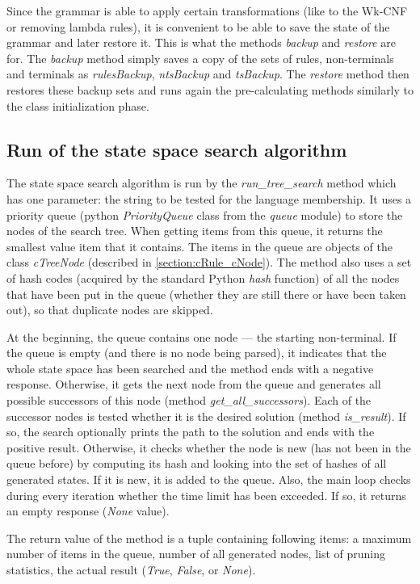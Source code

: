 Since the grammar is able to apply certain transformations (like to the Wk-CNF or removing lambda rules), it is convenient to be able to save the state of the grammar and later restore it. This is what the methods \textit{backup} and \textit{restore} are for. The \textit{backup} method simply saves a copy of the sets of rules, non-terminals and terminals as \textit{rulesBackup}, \textit{ntsBackup} and \textit{tsBackup}. The \textit{restore} method then restores these backup sets and runs again the pre-calculating methods similarly to the class initialization phase.

\subsection{Run of the state space search algorithm}
The state space search algorithm is run by the \textit{run\_tree\_search} method which has one parameter: the string to be tested for the language membership. It uses a priority queue (python \textit{PriorityQueue} class from the \textit{queue} module) to store the nodes of the search tree. When getting items from this queue, it returns the smallest value item that it contains. The items in the queue are objects of the class \textit{cTreeNode} (described in \ref{section:cRule_cNode}). The method also uses a set of hash codes (acquired by the standard Python \textit{hash} function) of all the nodes that have been put in the queue (whether they are still there or have been taken out), so that duplicate nodes are skipped.

At the beginning, the queue contains one node --- the starting non-terminal. If the queue is empty (and there is no node being parsed), it indicates that the whole state space has been searched and the method ends with a negative response. Otherwise, it gets the next node from the queue and generates all possible successors of this node (method \textit{get\_all\_successors}). Each of the successor nodes is tested whether it is the desired solution (method \textit{is\_result}). If so, the search optionally prints the path to the solution and ends with the positive result. Otherwise, it checks whether the node is new (has not been in the queue before) by computing its hash and looking into the set of hashes of all generated states. If it is new, it is added to the queue. Also, the main loop checks during every iteration whether the time limit has been exceeded. If so, it returns an empty response (\textit{None} value).

The return value of the method is a tuple containing following items: a maximum number of items in the queue, number of all generated nodes, list of pruning statistics, the actual result (\textit{True}, \textit{False}, or \textit{None}).

